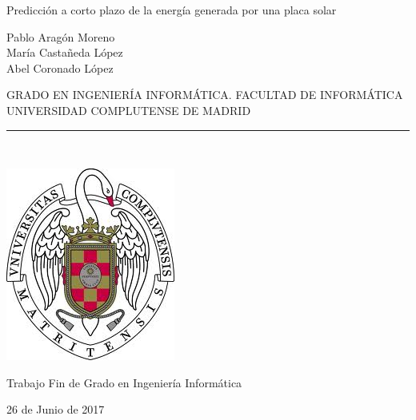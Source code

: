 \begin{center}

   \vspace{1cm}

   {\Large Predicción a corto plazo de la energía
   	 generada por una placa solar}\\

   \vspace{0.5cm}

   \vspace{0.5cm}

   {\large Pablo Aragón Moreno}\\
   {\large María Castañeda López}\\
   {\large Abel Coronado López}\\
 
   \vspace{0.5cm}

   GRADO EN INGENIERÍA INFORMÁTICA. FACULTAD DE INFORMÁTICA\\
   UNIVERSIDAD COMPLUTENSE DE MADRID \\


   \vspace{0.65cm}
   \rule{2in}{0.5pt}\\
   \vspace{0.85cm}

  \includegraphics[height=2.5in]{figures/escudo.jpg}
  

   \vspace{0.5cm}
Trabajo Fin de Grado en Ingeniería Informática

   \vspace{0.5cm}


  26 de Junio de 2017\\
   \vspace{1cm}

\end{center}

